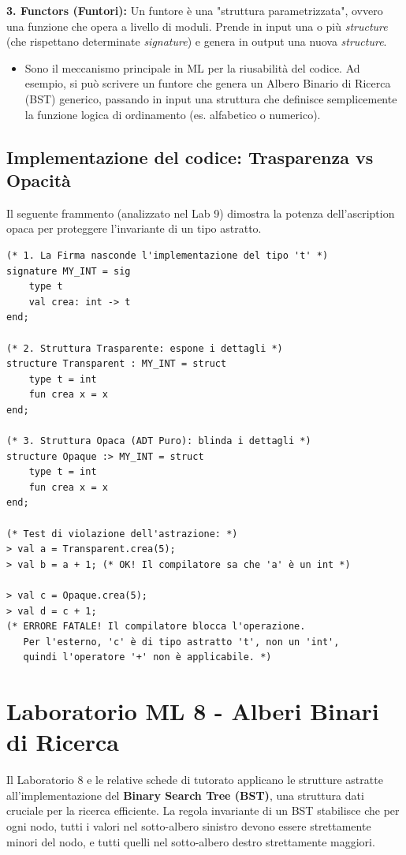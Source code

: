 \documentclass[12pt, a4paper]{article}
\begin{document}
\textbf{3. Functors (Funtori):}
Un funtore è una "struttura parametrizzata", ovvero una funzione che opera a livello di moduli. Prende in input una o più \textit{structure} (che rispettano determinate \textit{signature}) e genera in output una nuova \textit{structure}.
\begin{itemize}
    \item Sono il meccanismo principale in ML per la riusabilità del codice. Ad esempio, si può scrivere un funtore che genera un Albero Binario di Ricerca (BST) generico, passando in input una struttura che definisce semplicemente la funzione logica di ordinamento (es. alfabetico o numerico).
\end{itemize}

\newpage

\subsection{Implementazione del codice: Trasparenza vs Opacità}
Il seguente frammento (analizzato nel Lab 9) dimostra la potenza dell'ascription opaca per proteggere l'invariante di un tipo astratto.

\begin{verbatim}
(* 1. La Firma nasconde l'implementazione del tipo 't' *)
signature MY_INT = sig
    type t
    val crea: int -> t 
end;

(* 2. Struttura Trasparente: espone i dettagli *)
structure Transparent : MY_INT = struct
    type t = int
    fun crea x = x 
end;

(* 3. Struttura Opaca (ADT Puro): blinda i dettagli *)
structure Opaque :> MY_INT = struct
    type t = int
    fun crea x = x 
end;

(* Test di violazione dell'astrazione: *)
> val a = Transparent.crea(5);
> val b = a + 1; (* OK! Il compilatore sa che 'a' è un int *)

> val c = Opaque.crea(5);
> val d = c + 1; 
(* ERRORE FATALE! Il compilatore blocca l'operazione. 
   Per l'esterno, 'c' è di tipo astratto 't', non un 'int', 
   quindi l'operatore '+' non è applicabile. *)
\end{verbatim}


\section{Laboratorio ML 8 - Alberi Binari di Ricerca}

Il Laboratorio 8 e le relative schede di tutorato applicano le strutture astratte all'implementazione del \textbf{Binary Search Tree (BST)}, una struttura dati cruciale per la ricerca efficiente. La regola invariante di un BST stabilisce che per ogni nodo, tutti i valori nel sotto-albero sinistro devono essere strettamente minori del nodo, e tutti quelli nel sotto-albero destro strettamente maggiori.
\end{document}
